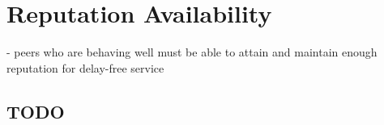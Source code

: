 \chapter{Reputation Availability}
- peers who are behaving well must be able to attain and maintain enough
  reputation for delay-free service

\section{TODO}
